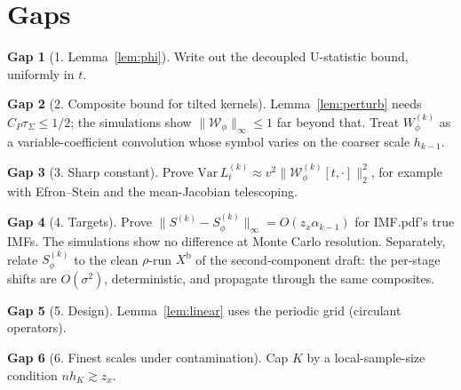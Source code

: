 \documentclass[11pt]{article}
\newcommand{\norm}[1]{\lVert#1\rVert}
\newcommand{\Wcal}{\mathcal W}
\theoremstyle{definition}
\newtheorem*{gap}{Gap}
\begin{document}
\section{Gaps}
\begin{gap}[1. Lemma~\ref{lem:phi}]
Write out the decoupled U-statistic bound, uniformly in \(t\).
\end{gap}
\begin{gap}[2. Composite bound for tilted kernels]
Lemma~\ref{lem:perturb} needs \(C_P\tau_\Sigma\le1/2\); the simulations show
\(\norm{\Wcal_\phi}_\infty\le1\) far beyond that.  Treat
\(W^{(k)}_\phi\) as a variable-coefficient convolution whose symbol varies on
the coarser scale \(h_{k-1}\).
\end{gap}
\begin{gap}[3. Sharp constant]
Prove \(\mathrm{Var}\,L^{(k)}_t\approx v^2\norm{\Wcal^{(k)}_\phi[t,\cdot]}_2^2\),
for example with Efron--Stein and the mean-Jacobian telescoping.
\end{gap}
\begin{gap}[4. Targets]
Prove \(\norm{S^{(k)}-S^{(k)}_\phi}_\infty=O(z_x\alpha_{k-1})\) for IMF.pdf's
true IMFs.  The simulations show no difference at Monte Carlo resolution.
Separately, relate \(S^{(k)}_\phi\) to the clean \(\rho\)-run \(X^{\mathrm b}\)
of the second-component draft: the per-stage shifts are \(O(\sigma^2)\),
deterministic, and propagate through the same composites.
\end{gap}
\begin{gap}[5. Design]
Lemma~\ref{lem:linear} uses the periodic grid (circulant operators).
\end{gap}
\begin{gap}[6. Finest scales under contamination]
Cap \(K\) by a local-sample-size condition \(nh_K\gtrsim z_x\).
\end{gap}

\appendix
\end{document}
